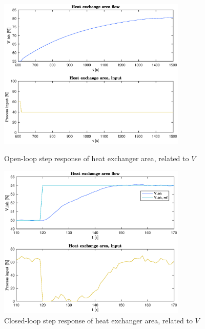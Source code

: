 \documentclass[12pt]{article}
\begin{document}
\begin{figure}
\centering
\includegraphics[width=0.8\textwidth]{../Systemanalyse/Log_Data_to_Matlab/Figurer/Stegeksperimenter/LC1028.eps}
\caption{Open-loop step response of heat exchanger area, related to $V$}
\label{fig:ol_step_LC1028}

\includegraphics[width=0.8\textwidth]{../Systemanalyse/Log_Data_to_Matlab/Figurer/Stegeksperimenter/LC1028_step.eps}
\caption{Closed-loop step response of heat exchanger area, related to $V$}
\label{fig:cl_step_LC1028}
\end{figure}
\end{document}
